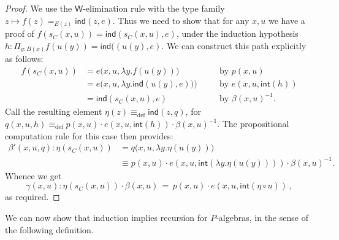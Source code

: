 \documentclass[10pt,a4paper,oneside,reqno]{amsart}
\numberwithin{equation}{section}
\theoremstyle{mythm}
\theoremstyle{mydef}
\theoremstyle{myrmk}
\newcommand{\by}[1]{\quad&&\text{by {$#1$}}}
\newcommand{\deq}{\equiv}
\newcommand{\peq}{=}
\newcommand{\defeq}{\deq_{\mathrm{def}}}
\renewcommand{\int}{\mathsf{int}}
\newcommand{\prd}[1]{\Pi_{#1}}
\newcommand{\W}{\mathsf{W}}
\newcommand{\ind}{\mathsf{ind}}
\begin{document}
\begin{proof}
We use the $\W$-elimination rule with the type family $z \mapsto f(z) =_{E(z)} \ind(z,e)$. Thus we need to show that for any $x,u$ we have a proof of $f(s_C(x,u)) = \ind(s_C(x,u),e)$, under the induction hypothesis $h : \prd{y:B(x)} f(u(y)) = \ind((u(y),e)$. We can construct this path explicitly as follows:
\begin{align*}
f(s_C(x,u)) &= e\big(x,u,\lambda y.f(u(y))\big) \by{p(x,u)}\\
	&= e\big(x,u,\lambda y.\ind(u(y),e))\big) \by{e(x,u,\int(h))}\\
	&= \ind(s_C(x,u),e) \by{\beta(x,u)^{-1}}.
\end{align*}
Call the resulting element $\eta(z) \defeq \ind(z,q)$, for $q(x,u,h) \defeq p(x,u)\cdot e(x,u,\int(h))\cdot\beta(x,u)^{-1}$.
The propositional computation rule for this case then provides:
\begin{align*}
\beta'(x,u,q) :  \eta(s_C(x,u)) &\peq q\big(x,u,\lambda{y}.\eta(u(y))\big)\\
	&\deq p(x,u)\cdot e(x,u,\int(\lambda y.\eta(u(y))))\cdot\beta(x,u)^{-1}.
\end{align*}
Whence we get
\[
\gamma (x,u) :  \eta(s_C(x,u)) \cdot \beta(x,u)\,\peq\,
 	p(x,u)\cdot e(x,u,\int(\eta\circ u))\, ,
	\]
as required.
\end{proof}

We can now show that induction implies recursion for $P$-algebras, in the sense of the following definition.
\end{document}
